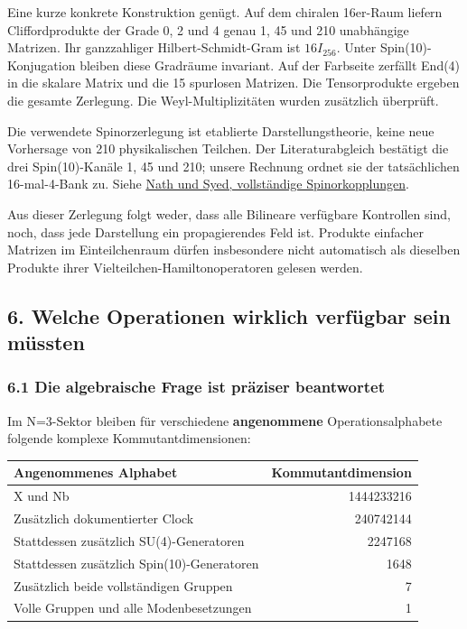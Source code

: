 Eine kurze konkrete Konstruktion genügt. Auf dem chiralen 16er-Raum
liefern Cliffordprodukte der Grade 0, 2 und 4 genau 1, 45 und 210
unabhängige Matrizen. Ihr ganzzahliger Hilbert-Schmidt-Gram ist
\(16I_{256}\). Unter Spin(10)-Konjugation bleiben diese Gradräume
invariant. Auf der Farbseite zerfällt End(4) in die skalare Matrix und
die 15 spurlosen Matrizen. Die Tensorprodukte ergeben die gesamte
Zerlegung. Die Weyl-Multiplizitäten wurden zusätzlich überprüft.

Die verwendete Spinorzerlegung ist etablierte Darstellungstheorie, keine
neue Vorhersage von 210 physikalischen Teilchen. Der Literaturabgleich
bestätigt die drei Spin(10)-Kanäle 1, 45 und 210; unsere Rechnung ordnet
sie der tatsächlichen 16-mal-4-Bank zu. Siehe
\href{https://arxiv.org/abs/hep-th/0109116}{Nath und Syed, vollständige
Spinorkopplungen}.

Aus dieser Zerlegung folgt weder, dass alle Bilineare verfügbare
Kontrollen sind, noch, dass jede Darstellung ein propagierendes Feld
ist. Produkte einfacher Matrizen im Einteilchenraum dürfen insbesondere
nicht automatisch als dieselben Produkte ihrer
Vielteilchen-Hamiltonoperatoren gelesen werden.

\subsection{6. Welche Operationen wirklich verfügbar sein
müssten}\label{welche-operationen-wirklich-verfuxfcgbar-sein-muxfcssten}

\subsubsection{6.1 Die algebraische Frage ist präziser
beantwortet}\label{die-algebraische-frage-ist-pruxe4ziser-beantwortet}

Im N=3-Sektor bleiben für verschiedene \textbf{angenommene}
Operationsalphabete folgende komplexe Kommutantdimensionen:

{\def\LTcaptype{none} %
\begin{longtable}[]{@{}lr@{}}
\toprule\noalign{}
Angenommenes Alphabet & Kommutantdimension \\
\midrule\noalign{}
\endhead
\bottomrule\noalign{}
\endlastfoot
X und Nb & 1444233216 \\
Zusätzlich dokumentierter Clock & 240742144 \\
Stattdessen zusätzlich SU(4)-Generatoren & 2247168 \\
Stattdessen zusätzlich Spin(10)-Generatoren & 1648 \\
Zusätzlich beide vollständigen Gruppen & 7 \\
Volle Gruppen und alle Modenbesetzungen & 1 \\
\end{longtable}
}


